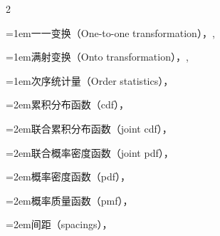 \begin{multicols}{2}
\par\addvspace{2pt}
\par\noindent\hangindent=1em\hspace*{0em}\label{idx:729}一一变换（One-to-one transformation），\hyperref[idxocc:729:71]{\pageref*{idxocc:729:71}}, \hyperref[idxocc:729:160]{\pageref*{idxocc:729:160}}\par
\par\addvspace{2pt}
\par\noindent\hangindent=1em\hspace*{0em}\label{idx:730}满射变换（Onto transformation），\hyperref[idxocc:730:71]{\pageref*{idxocc:730:71}}, \hyperref[idxocc:730:160]{\pageref*{idxocc:730:160}}\par
\par\addvspace{2pt}
\par\noindent\hangindent=1em\hspace*{0em}\label{idx:731}次序统计量（Order statistics），\hyperref[def:5.4.1]{\pageref*{def:5.4.1}}\par
\par\noindent\hangindent=2em\hspace*{1em}\label{idx:732}累积分布函数（cdf），\hyperref[thm:5.4.3]{\pageref*{thm:5.4.3}}\par
\par\noindent\hangindent=2em\hspace*{1em}\label{idx:733}联合累积分布函数（joint cdf），\hyperref[exercise:5.26]{\pageref*{exercise:5.26}}\par
\par\noindent\hangindent=2em\hspace*{1em}\label{idx:734}联合概率密度函数（joint pdf），\hyperref[thm:5.4.6]{\pageref*{thm:5.4.6}}\par
\par\noindent\hangindent=2em\hspace*{1em}\label{idx:735}概率密度函数（pdf），\hyperref[thm:5.4.4]{\pageref*{thm:5.4.4}}\par
\par\noindent\hangindent=2em\hspace*{1em}\label{idx:736}概率质量函数（pmf），\hyperref[thm:5.4.3]{\pageref*{thm:5.4.3}}\par
\par\noindent\hangindent=2em\hspace*{1em}\label{idx:737}间距（spacings），\hyperref[idxocc:737:183]{\pageref*{idxocc:737:183}}\par

\end{multicols}
